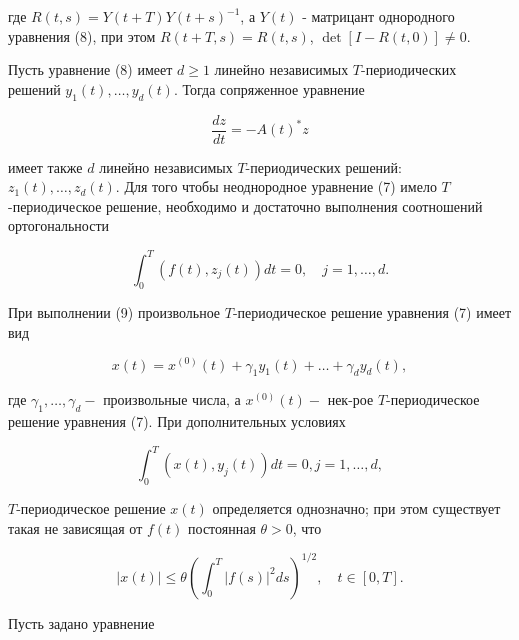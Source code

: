 \documentclass[10pt]{article}
\begin{document}
где $R(t, s)=Y(t+T) Y(t+s)^{-1}$, а $Y(t)$ - матрицант однородного уравнения (8), при этом $R(t+T, s)=R(t, s)$, $\operatorname{det}[I-R(t, 0)] \neq 0$.



Пусть уравнение (8) имеет $d \geqslant 1$ линейно независимых $T$-периодических решений $y_{1}(t), \ldots, y_{d}(t)$. Тогда сопряженное уравнение



\[

\frac{d z}{d t}=-A(t)^{*} z

\]



имеет также $d$ линейно независимых $T$-периодических решений: $z_{1}(t), \ldots, z_{d}(t)$. Для того чтобы неоднородное уравнение (7) имело $T$-периодическое решение, необходимо и достаточно выполнения соотношений ортогональности



\[

\int_{0}^{T}\left(f(t), z_{j}(t)\right) d t=0, \quad j=1, \ldots, d .

\]



При выполнении (9) произвольное $T$-периодическое решение уравнения (7) имеет вид



\[

x(t)=x^{(0)}(t)+\gamma_{1} y_{1}(t)+\ldots+\gamma_{d} y_{d}(t),

\]



где $\gamma_{1}, \ldots, \gamma_{d}-$ произвольные числа, а $x^{(0)}(t)-$ нек-рое $T$-периодическое решение уравнения (7). При дополнительных условиях



\[

\int_{0}^{T}\left(x(t), y_{j}(t)\right) d t=0, j=1, \ldots, d,

\]



$T$-периодическое решение $x(t)$ определяется однозначно; при этом существует такая не зависящая от $f(t)$ постоянная $\theta>0$, что



\[

|x(t)| \leqslant \theta\left(\int_{0}^{T}|f(s)|^{2} d s\right)^{1 / 2}, \quad t \in[0, T] .

\]



Пусть задано уравнение
\end{document}
